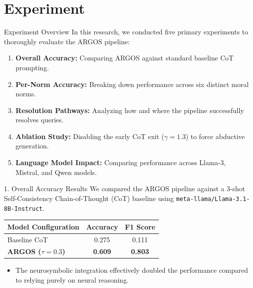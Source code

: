 \documentclass{beamer}
\begin{document}
    \section{Experiment}

    \begin{frame}{Experiment Overview}
        In this research, we conducted five primary experiments to thoroughly evaluate the ARGOS pipeline:
        \vspace{0.25cm}
        \begin{enumerate}
            \item \textbf{Overall Accuracy:} Comparing ARGOS against standard baseline CoT prompting.
            \item \textbf{Per-Norm Accuracy:} Breaking down performance across six distinct moral norms.
            \item \textbf{Resolution Pathways:} Analyzing how and where the pipeline successfully resolves queries.
            \item \textbf{Ablation Study:} Disabling the early CoT exit ($\gamma=1.3$) to force abductive generation.
            \item \textbf{Language Model Impact:} Comparing performance across Llama-3, Mistral, and Qwen models.
        \end{enumerate}
    \end{frame}

    \begin{frame}{1. Overall Accuracy Results}
        We compared the ARGOS pipeline against a 3-shot Self-Consistency Chain-of-Thought (CoT) baseline using \texttt{meta-llama/Llama-3.1-8B-Instruct}.
        \vspace{0.5cm}
        \begin{table}
            \centering
            \begin{tabular}{lcc}
                \toprule
                \textbf{Model Configuration} & \textbf{Accuracy} & \textbf{F1 Score} \\
                \midrule
                Baseline CoT & 0.275 & 0.111 \\
                \textbf{ARGOS ($\tau=0.3$)} & \textbf{0.609} & \textbf{0.803} \\
                \bottomrule
            \end{tabular}
        \end{table}
        \vspace{0.3cm}
        \begin{itemize}
            \item The neurosymbolic integration effectively doubled the performance compared to relying purely on neural reasoning.
        \end{itemize}
    \end{frame}
\end{document}
